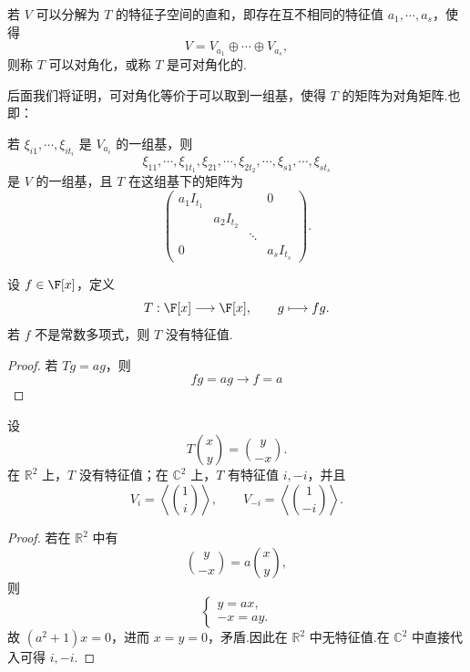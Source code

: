 \begin{definition}
	若 $V$ 可以分解为 $T$ 的特征子空间的直和，即存在互不相同的特征值 $a_1,\cdots,a_s$，使得
	\[
	V=V_{a_1}\oplus\cdots\oplus V_{a_s},
	\]
	则称 $T$ 可以对角化，或称 $T$ 是可对角化的.
\end{definition}
后面我们将证明，可对角化等价于可以取到一组基，使得 $T$ 的矩阵为对角矩阵.也即：

若 $\xi_{i1},\cdots,\xi_{it_i}$ 是 $V_{a_i}$ 的一组基，则
\[
\xi_{11},\cdots,\xi_{1t_1},\xi_{21},\cdots,\xi_{2t_2},\cdots,
\xi_{s1},\cdots,\xi_{st_s}
\]
是 $V$ 的一组基，且 $T$ 在这组基下的矩阵为
\[
\begin{pmatrix}
	a_1I_{t_1}&&&0\\
	&a_2I_{t_2}&&\\
	&&\ddots&\\
	0&&&a_sI_{t_s}
\end{pmatrix}.
\]





\begin{example}
	设 $f\in\F[x]$，定义
	\[
	T:\F[x]\longrightarrow\F[x],\qquad g\longmapsto fg.
	\]
	若 $f$ 不是常数多项式，则 $T$ 没有特征值.
\end{example}

\begin{proof}
	若 $Tg=ag$，则
	\[
	fg=ag\rightarrow f = a
	\]
	
\end{proof}

\begin{example}
	设
	\[
	T\binom{x}{y}=\binom{y}{-x}.
	\]
	在 $\mathbb{R}^2$ 上，$T$ 没有特征值；在 $\mathbb{C}^2$ 上，$T$ 有特征值 $i,-i$，并且
	\[
	V_i=\left\langle\binom{1}{i}\right\rangle,
	\qquad
	V_{-i}=\left\langle\binom{1}{-i}\right\rangle.
	\]
\end{example}

\begin{proof}
	若在 $\mathbb{R}^2$ 中有
	\[
	\binom{y}{-x}=a\binom{x}{y},
	\]
	则
	\[
	\begin{cases}
		y=ax,\\
		-x=ay.
	\end{cases}
	\]
	故 $(a^2+1)x=0$，进而 $x=y=0$，矛盾.因此在 $\mathbb{R}^2$ 中无特征值.在 $\mathbb{C}^2$ 中直接代入可得 $i,-i$.
\end{proof}

